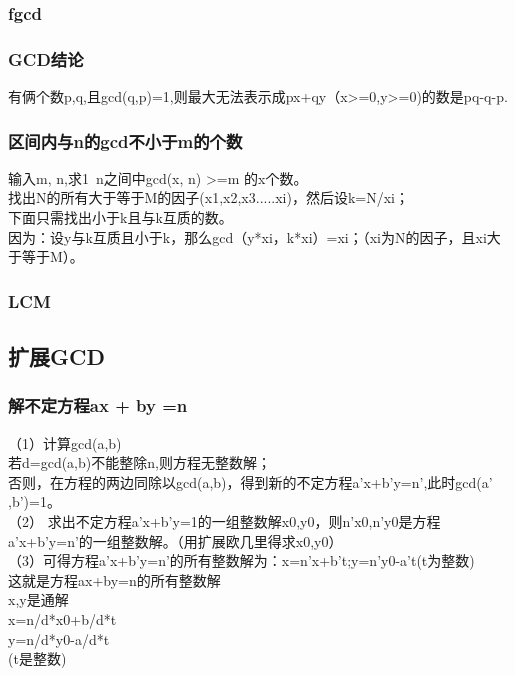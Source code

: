 \documentclass[a4paper]{article}
\begin{document}
\begin{CJK*}{UTF8}{gbsn}
\begin{multicols}{3}
\begin{flushleft}
\subsubsection{fgcd}



\subsubsection{GCD结论}
有俩个数p,q,且gcd(q,p)=1,则最大无法表示成px+qy（x>=0,y>=0)的数是pq-q-p.\\

\subsubsection{区间内与n的gcd不小于m的个数 }
输入m, n,求1~n之间中gcd(x, n) >=m 的x个数。\\
找出N的所有大于等于M的因子(x1,x2,x3.....xi)，然后设k=N/xi；\\
下面只需找出小于k且与k互质的数。\\
因为：设y与k互质且小于k，那么gcd（y*xi，k*xi）=xi；（xi为N的因子，且xi大于等于M）。\\

\subsubsection{LCM}



\subsection{扩展GCD}



\subsubsection{解不定方程ax + by =n}
（1）计算gcd(a,b)\\
若d=gcd(a,b)不能整除n,则方程无整数解；\\
否则，在方程的两边同除以gcd(a,b)，得到新的不定方程a'x+b'y=n',此时gcd(a' ,b')=1。\\
（2） 求出不定方程a'x+b'y=1的一组整数解x0,y0，则n'x0,n'y0是方程a'x+b'y=n'的一组整数解。（用扩展欧几里得求x0,y0）\\
（3）可得方程a'x+b'y=n'的所有整数解为：x=n'x+b't;y=n'y0-a't(t为整数)\\
这就是方程ax+by=n的所有整数解\\
x,y是通解\\
x=n/d*x0+b/d*t\\
y=n/d*y0-a/d*t\\
(t是整数) \\


\end{flushleft}
\end{multicols}
\end{CJK*}
\end{document}

